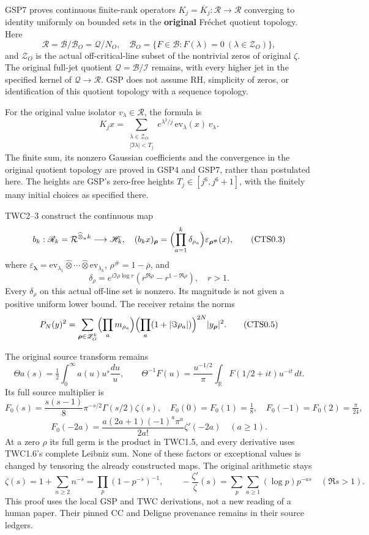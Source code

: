 GSP7 proves continuous finite-rank operators
\(K_j=\overline K_j:\mathcal R\to\mathcal R\) converging to identity
uniformly on bounded sets in the \textbf{original} Fréchet quotient
topology. Here \[
\mathcal R=\mathcal B/\mathcal B_O=\mathcal Q/N_O,
\quad \mathcal B_O=\{F\in\mathcal B:F(\lambda)=0\ (\lambda\in\mathscr Z_O)\},
\tag{CTS0.1}
\] and \(\mathscr Z_O\) is the actual off-critical-line subset of the
nontrivial zeros of original \(\zeta\). The original full-jet quotient
\(\mathcal Q=\mathcal B/\mathcal I\) remains, with every higher jet in
the specified kernel of \(\mathcal Q\to\mathcal R\). GSP does not assume
RH, simplicity of zeros, or identification of this quotient topology
with a sequence topology.

For the original value isolator \(v_\lambda\in\mathcal R\), the formula
is \[
K_jx=\sum_{\substack{\lambda\in\mathscr Z_O\\|\Im\lambda|<T_j}}
e^{\lambda^2/j}\,\mathrm{ev}_\lambda(x)\,v_\lambda.
\tag{CTS0.2}
\] The finite sum, its nonzero Gaussian coefficients and the convergence
in the original quotient topology are proved in GSP4 and GSP7, rather
than postulated here. The heights are GSP's zero-free heights
\(T_j\in[j^6,j^6+1]\), with the finitely many initial choices as
specified there.

TWC2--3 construct the continuous map \[
b_k:\mathscr R_k=\mathcal R^{\widehat\otimes_\pi k}\longrightarrow\mathscr H_k,
\quad
(b_kx)_{\boldsymbol\rho}=\Bigl(\prod_{a=1}^k\delta_{\rho_a}\Bigr)
\varepsilon_{\boldsymbol\rho^\#}(x),
\tag{CTS0.3}
\] where
\(\varepsilon_{\boldsymbol\lambda}=\mathrm{ev}_{\lambda_1}\widehat\otimes\cdots\widehat\otimes\mathrm{ev}_{\lambda_k}\),
\(\rho^\#=1-\overline\rho\), and \[
\delta_\rho=e^{i\Im\rho\log r}(r^{\Re\rho}-r^{1-\Re\rho}),\quad r>1.
\tag{CTS0.4}
\] Every \(\delta_\rho\) on this actual off-line set is nonzero. Its
magnitude is not given a positive uniform lower bound. The receiver
retains the norms \[
P_N(y)^2=\sum_{\boldsymbol\rho\in\mathscr Z_O^k}
\Bigl(\prod_a m_{\rho_a}\Bigr)\Bigl(\prod_a(1+|\Im\rho_a|)\Bigr)^{2N}
|y_{\boldsymbol\rho}|^2.
\tag{CTS0.5}
\]

The original source transform remains \[
\Theta a(s)=\tfrac12\int_0^\infty a(u)u^s\frac{du}{u},\qquad
\Theta^{-1}F(u)=\frac{u^{-1/2}}\pi\int_{\mathbb R}F(1/2+it)u^{-it}\,dt.
\tag{CTS0.6}
\] Its full source multiplier is \[
F_0(s)=\frac{s(s-1)}8\pi^{-s/2}\Gamma(s/2)\zeta(s),
\quad F_0(0)=F_0(1)=\tfrac18,\quad F_0(-1)=F_0(2)=\tfrac\pi{24},
\] \[
F_0(-2a)=\frac{a(2a+1)(-1)^a\pi^a}{2a!}\zeta'(-2a)\quad(a\ge1).
\tag{CTS0.7}
\] At a zero \(\rho\) its full germ is the product in TWC1.5, and every
derivative uses TWC1.6's complete Leibniz sum. None of these factors or
exceptional values is changed by tensoring the already constructed maps.
The original arithmetic stays \[
\zeta(s)=1+\sum_{n\ge2}n^{-s}=\prod_p(1-p^{-s})^{-1},\qquad
-\frac{\zeta'}\zeta(s)=\sum_p\sum_{a\ge1}(\log p)p^{-as}\quad(\Re s>1).
\tag{CTS0.8}
\] This proof uses the local GSP and TWC derivations, not a new reading
of a human paper. Their pinned CC and Deligne provenance remains in
their source ledgers.

